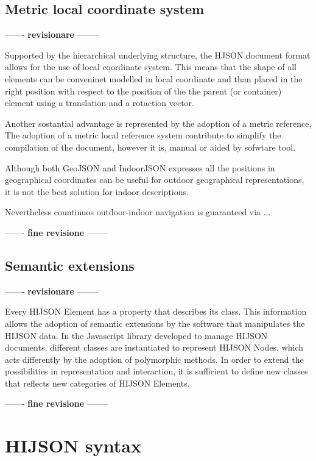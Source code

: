 \documentclass{sig-alternate}
\begin{document}
\subsection{Metric local coordinate system}\label{metric-local-coordinate-system}


------- \textbf{revisionare} --------

Supported by the hierarchical underlying structure, the HJSON document format allows 
for the use of local coordinate system. This means that the shape of all elements can 
be conveninet modelled in local coordinate and than placed in the right position 
with respect to the position of the the parent (or container) element using a 
translation and a rotaction vector.

Another sostantial advantage is represented by the adoption of a metric reference, 
The adoption of a metric local reference system contribute to simplify the compilation 
of the document, however it is, manual or aided by sofwtare tool.


Although both GeoJSON and IndoorJSON expresses all the positions in geographical 
coordinates can be useful for outdoor geographical
representations, it is not the best solution for indoor descriptions.

Nevertheless countinuos outdoor-indoor navigation is guaranteed via ...

------- \textbf{fine revisione} --------


\subsection{Semantic extensions}\label{semantic-extensions}


------- \textbf{revisionare} --------


Every HIJSON Element has a property that describes its class. This
information allows the adoption of semantic extensions by the software
that manipulates the HIJSON data. In the Javascript library developed to
manage HIJSON documents, different classes are instantiated to represent
HIJSON Nodes, which acts differently by the adoption of polymorphic
methods. In order to extend the possibilities in representation and
interaction, it is sufficient to define new classes that reflects new
categories of HIJSON Elements.

------- \textbf{fine revisione} --------

\section{HIJSON syntax}\label{hijson-syntax}
\end{document}
